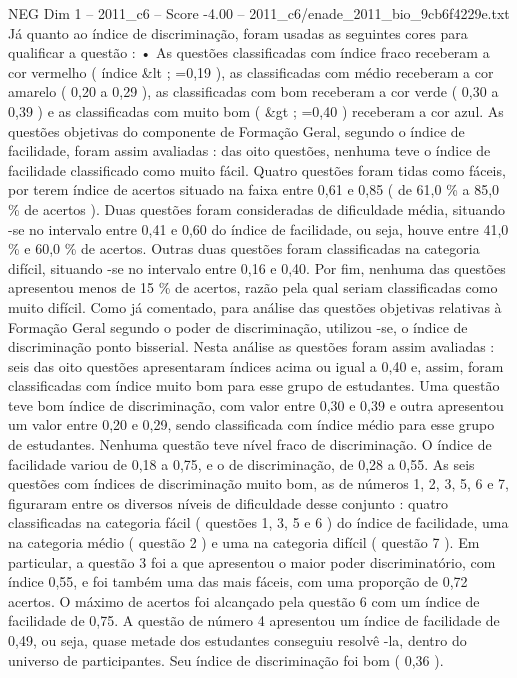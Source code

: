 \begin{textsample}{NEG Dim 1 – 2011\_c6 – Score -4.00 – 2011\_c6/enade\_2011\_bio\_9cb6f4229e.txt}
Já quanto ao índice de discriminação, foram usadas as seguintes cores para qualificar a questão : • As questões classificadas com índice fraco receberam a cor vermelho ( índice \&lt ; =0,19 ), as classificadas com médio receberam a cor amarelo ( 0,20 a 0,29 ), as classificadas com bom receberam a cor verde ( 0,30 a 0,39 ) e as classificadas com muito bom ( \&gt ; =0,40 ) receberam a cor azul.
As questões objetivas do componente de Formação Geral, segundo o índice de facilidade, foram assim avaliadas : das oito questões, nenhuma teve o índice de facilidade classificado como muito fácil.
Quatro questões foram tidas como fáceis, por terem índice de acertos situado na faixa entre 0,61 e 0,85 ( de 61,0 \% a 85,0 \% de acertos ).
Duas questões foram consideradas de dificuldade média, situando -se no intervalo entre 0,41 e 0,60 do índice de facilidade, ou seja, houve entre 41,0 \% e 60,0 \% de acertos.
Outras duas questões foram classificadas na categoria difícil, situando -se no intervalo entre 0,16 e 0,40.
Por fim, nenhuma das questões apresentou menos de 15 \% de acertos, razão pela qual seriam classificadas como muito difícil.
Como já comentado, para análise das questões objetivas relativas à Formação Geral segundo o poder de discriminação, utilizou -se, o índice de discriminação ponto bisserial.
Nesta análise as questões foram assim avaliadas : seis das oito questões apresentaram índices acima ou igual a 0,40 e, assim, foram classificadas com índice muito bom para esse grupo de estudantes.
Uma questão teve bom índice de discriminação, com valor entre 0,30 e 0,39 e outra apresentou um valor entre 0,20 e 0,29, sendo classificada com índice médio para esse grupo de estudantes.
Nenhuma questão teve nível fraco de discriminação.
O índice de facilidade variou de 0,18 a 0,75, e o de discriminação, de 0,28 a 0,55.
As seis questões com índices de discriminação muito bom, as de números 1, 2, 3, 5, 6 e 7, figuraram entre os diversos níveis de dificuldade desse conjunto : quatro classificadas na categoria fácil ( questões 1, 3, 5 e 6 ) do índice de facilidade, uma na categoria médio ( questão 2 ) e uma na categoria difícil ( questão 7 ).
Em particular, a questão 3 foi a que apresentou o maior poder discriminatório, com índice 0,55, e foi também uma das mais fáceis, com uma proporção de 0,72 acertos.
O máximo de acertos foi alcançado pela questão 6 com um índice de facilidade de 0,75.
A questão de número 4 apresentou um índice de facilidade de 0,49, ou seja, quase metade dos estudantes conseguiu resolvê -la, dentro do universo de participantes.
Seu índice de discriminação foi bom ( 0,36 ).

\end{textsample}
